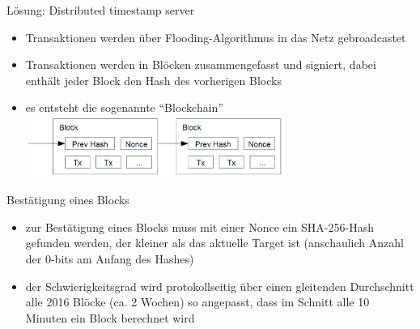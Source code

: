 \documentclass[handout]{beamer} \usepackage[german]{babel}
\begin{document}
\begin{frame}{Lösung: Distributed timestamp server}
	\begin{itemize}
		\item Transaktionen werden über Flooding-Algorithmus in das Netz
			gebroadcastet
		\item Transaktionen werden in Blöcken zusammengefasst und signiert,
			dabei enthält jeder Block den Hash des vorherigen Blocks
		\item es entsteht die sogenannte "`Blockchain"'
	\includegraphics[height=20mm]{btcvortrag/ProofOfWorkChain.png}
	\end{itemize}
\end{frame}

\begin{frame}{Bestätigung eines Blocks}
	\begin{itemize}
		\item zur Bestätigung eines Blocks muss mit einer Nonce
			ein SHA-256-Hash gefunden werden, der kleiner als das aktuelle Target
			ist (anschaulich Anzahl der 0-bits am Anfang des Hashes)
		\item der Schwierigkeitsgrad wird protokollseitig über einen gleitenden
			Durchschnitt alle 2016 Blöcke (ca. 2 Wochen) so angepasst, dass im Schnitt alle 10 Minuten ein Block
			berechnet wird
	\end{itemize}
\end{frame}
\end{document}
